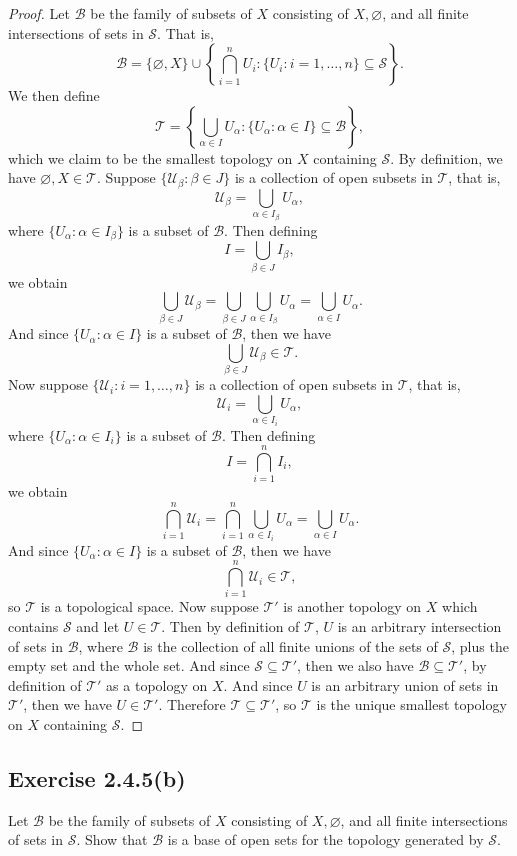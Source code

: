 \documentclass[12pt]{article}
\newenvironment{problem}
    {\begin{lrbox}{\mybox}\begin{minipage}{\textwidth-10pt}}
    {\end{minipage}\end{lrbox}\framebox[6.5in]{\usebox{\mybox}}\\}
\let\emptyset\varnothing
\newcommand{\T}{\mathscr{T}}
\renewcommand{\S}{\mathscr{S}}
\newcommand{\B}{\mathscr{B}}
\begin{document}
\begin{proof}
    Let $\B$ be the family of subsets of $X$ consisting of $X,\emptyset$, and all finite intersections of sets in $\S$. That is,
    \[\B = \{\emptyset,X\}\cup\left\{\bigcap_{i=1}^nU_i : \{U_i : i=1,\dots,n\} \subseteq \S\right\}.\]
    We then define
    \[\T = \left\{\bigcup_{\alpha\in I}U_\alpha : \{U_\alpha : \alpha\in I\} \subseteq \B\right\},\]
    which we claim to be the smallest topology on $X$ containing $\S$. By definition, we have $\emptyset, X \in\T$. Suppose $\{\mathcal{U}_\beta: \beta\in J\}$ is a collection of open subsets in $\T$, that is,
    \[\mathcal{U}_\beta = \bigcup_{\alpha\in I_\beta}U_\alpha,\]
    where $\{U_\alpha : \alpha\in I_\beta\}$ is a subset of $\B$. Then defining
    \[I = \bigcup_{\beta \in J}I_\beta,\]
    we obtain
    \[\bigcup_{\beta \in J}\mathcal{U}_\beta = \bigcup_{\beta \in J}\bigcup_{\alpha\in I_\beta}U_\alpha = \bigcup_{\alpha\in I}U_\alpha.\]
    And since $\{U_\alpha : \alpha \in I\}$ is a subset of $\B$, then we have
    \[\bigcup_{\beta \in J}\mathcal{U}_\beta \in \T.\]
    Now suppose $\{\mathcal{U}_i: i=1,\dots,n\}$ is a collection of open subsets in $\T$, that is,
    \[\mathcal{U}_i = \bigcup_{\alpha\in I_i}U_\alpha,\]
    where $\{U_\alpha : \alpha\in I_i\}$ is a subset of $\B$. Then defining
    \[I = \bigcap_{i=1}^nI_i,\]
    we obtain
    \[\bigcap_{i=1}^n\mathcal{U}_i = \bigcap_{i=1}^n\bigcup_{\alpha\in I_i}U_\alpha = \bigcup_{\alpha\in I}U_\alpha.\]
    And since $\{U_\alpha : \alpha \in I\}$ is a subset of $\B$, then we have
    \[\bigcap_{i=1}^n\mathcal{U}_i \in \T,\]
    so $\T$ is a topological space. Now suppose $\T'$ is another topology on $X$ which contains $\S$ and let $U\in\T$. Then by definition of $\T$, $U$ is an arbitrary intersection of sets in $\B$, where $\B$ is the collection of all finite unions of the sets of $\S$, plus the empty set and the whole set. And since $\S\subseteq\T'$, then we also have $\B\subseteq\T'$, by definition of $\T'$ as a topology on $X$. And since $U$ is an arbitrary union of sets in $\T'$, then we have $U\in\T'$. Therefore $\T\subseteq\T'$, so $\T$ is the unique smallest topology on $X$ containing $\S$.
    
\end{proof}

\subsection*{Exercise 2.4.5(b)}
\begin{problem}
    Let $\B$ be the family of subsets of $X$ consisting of $X,\emptyset$, and all finite intersections of sets in $\S$. Show that $\B$ is a base of open sets for the topology generated by $\S$.
\end{problem}
\end{document}
